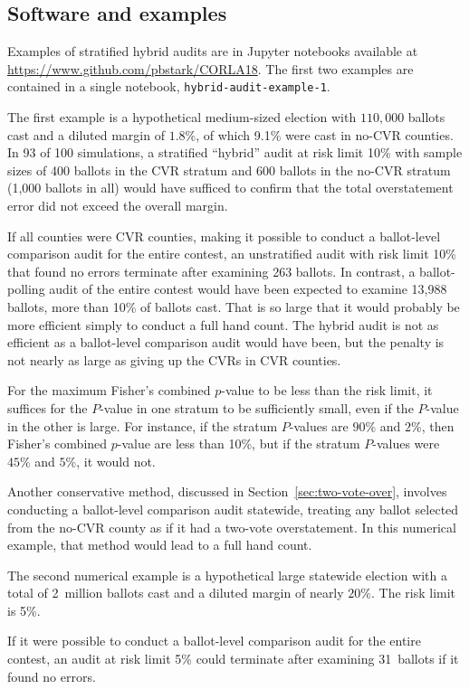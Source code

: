 \documentclass[runningheads]{llncs}
\newcommand{\comment}[1]{}
\begin{document}
\subsection{Software and examples}
Examples of stratified hybrid audits are in Jupyter notebooks available
at \url{https://www.github.com/pbstark/CORLA18}.
The first two examples are contained in a single notebook, \texttt{hybrid-audit-example-1}.

The first example is a hypothetical medium-sized election with 
$110,000$ ballots cast and a diluted margin of $1.8\%$, of which 
9.1\% were cast in no-CVR counties. 
In 93 of 100 simulations, a stratified ``hybrid'' audit at risk limit 10\% with sample sizes of 400 ballots 
in the CVR stratum and 600 ballots in the no-CVR stratum
(1,000 ballots in all)
would have sufficed to confirm that the total overstatement error did not exceed the overall margin.

If all counties were CVR counties, making it possible to conduct a ballot-level comparison audit for the entire contest, an unstratified audit with risk limit 10\% that found no errors terminate 
after examining 263 ballots.
In contrast, a ballot-polling audit of the entire contest would have been expected to examine
13,988 ballots, more than 10\% of ballots cast.
That is so large that it would probably be more efficient simply to conduct a full hand count.
The hybrid audit is not as efficient as a ballot-level comparison audit would have been, but the penalty
is not nearly as large as giving up the CVRs in CVR counties.

For the maximum Fisher's combined $p$-value to be less than the risk limit,
it suffices for the $P$-value in one stratum to be sufficiently small, even if 
the $P$-value in the other is large. 
For instance, if the stratum $P$-values are $90\%$ and $2\%$,
then Fisher's combined $p$-value are less than 10\%,
but if the stratum $P$-values were $45\%$ and $5\%$, it would not.

Another conservative method, discussed in Section~\ref{sec:two-vote-over},
involves conducting a ballot-level comparison audit statewide,
treating any ballot selected from the no-CVR county as if it had a two-vote overstatement.
In this numerical example, that method would lead to a full hand count.

The second numerical example is a hypothetical large statewide election with a total of 
2~million ballots cast and a diluted margin of nearly $20\%$.  
The risk limit is 5\%.
\comment{How many ballots in each stratum?}
If it were possible to conduct a ballot-level comparison audit for the entire contest, 
an audit at risk limit 5\% could terminate after examining 31~ballots if it found no errors.
\end{document}
